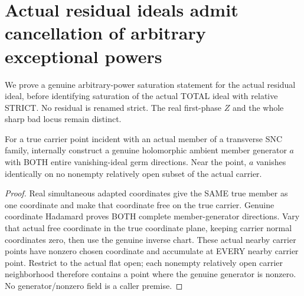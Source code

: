 \section{Actual residual ideals admit cancellation of arbitrary exceptional powers}

We prove a genuine arbitrary-power saturation statement for the actual
residual ideal, before identifying saturation of the actual TOTAL ideal
with relative STRICT. No residual is renamed strict. The real first-phase
$Z$ and the whole sharp bad locus remain distinct.

\begin{lemma}
\label{hir:sharp-actual-transverse-member-generator-nonzero}
\leanok
For a true carrier point incident with an actual member of a transverse SNC
family, internally construct a genuine holomorphic ambient member generator
$a$ with BOTH entire vanishing-ideal germ directions. Near the point, $a$
vanishes identically on no nonempty relatively open subset of the actual
carrier.
\end{lemma}
\begin{proof}
Real simultaneous adapted coordinates give the SAME true member as one
coordinate and make that coordinate free on the true carrier. Genuine
coordinate Hadamard proves BOTH complete member-generator directions.
Vary that actual free coordinate in the true coordinate plane, keeping
carrier normal coordinates zero, then use the genuine inverse chart.
These actual nearby carrier points have nonzero chosen coordinate and
accumulate at EVERY nearby carrier point. Restrict to the actual flat open;
each nonempty relatively open carrier neighborhood therefore contains a
point where the genuine generator is nonzero. No generator/nonzero field
is a caller premise.
\end{proof}

